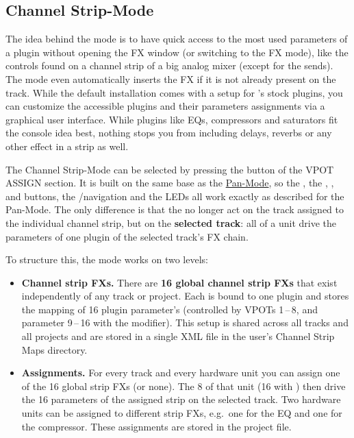 \subsection{Channel Strip-Mode}\label{channelstrip}

The idea behind the mode is to have quick access to the most used
parameters of a plugin without opening the FX window (or switching to
the FX mode), like the controls found on a channel strip of a big
analog mixer (except for the sends). The mode even automatically
inserts the FX if it is not already present on the track. While the
default installation comes with a setup for \reaper's stock plugins,
you can customize the accessible plugins and their parameters
assignments via a graphical user interface. While plugins like EQs,
compressors and saturators fit the console idea best, nothing stops
you from including delays, reverbs or any other effect in a strip as
well.

The Channel Strip-Mode can be selected by pressing the \track button of the
VPOT ASSIGN section. It is built on the same base as the
\hyperref[panmode]{Pan-Mode}, so the \faders, the \select, \mute, \solo
and \rec buttons, the \bankdu/\channeldu navigation and the LEDs all work
exactly as described for the Pan-Mode. The only difference is that the
\vpots no longer act on the track assigned to the individual channel strip,
but on the \textbf{selected track}: all \vpots of a unit drive the
parameters of one plugin of the selected track's FX chain.

To structure this, the mode works on two levels:

\begin{itemize}
\item \textbf{Channel strip FXs.} There are \textbf{16 global channel
  strip FXs} that exist independently of any track or project. Each is
  bound to one plugin and stores the mapping of 16 plugin parameter's
  (controlled by VPOTs 1\,--\,8, and parameter 9\,--\,16 with the \shift
  modifier). This setup is shared across all tracks and all projects and
  are stored in a single XML file in the user's Channel Strip Maps directory.
\item \textbf{Assignments.} For every track and every hardware unit you can
  assign one of the 16 global strip FXs (or none). The 8 \vpots of that unit
  (16 with \shift) then drive the 16 parameters of the assigned strip on the
  selected track. Two hardware units can be assigned to different
  strip FXs, e.g.~one for the EQ and one for the compressor. These assignments
  are stored in the \reaper project file.
\end{itemize}

